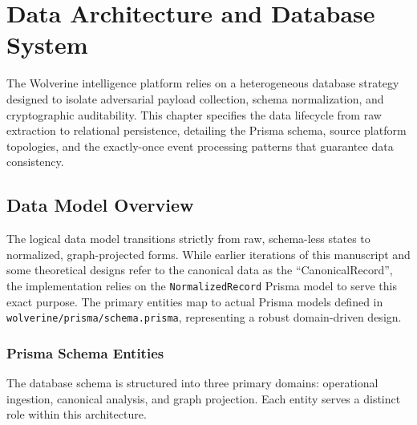 \chapter{Data Architecture and Database System}
\label{ch:data-architecture}

The Wolverine intelligence platform relies on a heterogeneous database strategy designed to isolate adversarial payload collection, schema normalization, and cryptographic auditability. This chapter specifies the data lifecycle from raw extraction to relational persistence, detailing the Prisma schema, source platform topologies, and the exactly-once event processing patterns that guarantee data consistency.

\section{Data Model Overview}
\label{sec:data-overview}
The logical data model transitions strictly from raw, schema-less states to normalized, graph-projected forms. While earlier iterations of this manuscript and some theoretical designs refer to the canonical data as the ``CanonicalRecord'', the implementation relies on the \texttt{NormalizedRecord} Prisma model to serve this exact purpose. The primary entities map to actual Prisma models defined in \texttt{wolverine/prisma/schema.prisma}, representing a robust domain-driven design.

\subsection{Prisma Schema Entities}
\label{sec:prisma-schema}

The database schema is structured into three primary domains: operational ingestion, canonical analysis, and graph projection. Each entity serves a distinct role within this architecture.

